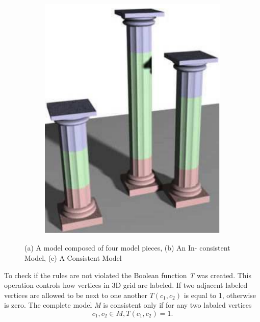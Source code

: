 \documentclass[b5paper,twoside,11pt]{article}
\begin{document}
\begin{figure}
\begin{subfigure}[b]{0.3\textwidth}
		\includegraphics[width=\textwidth]{1c}
		\caption{}
		\label{fig:1c}
	\end{subfigure}
	\caption{ (a) A model composed of four model pieces, (b) An In-
		consistent Model, (c) A Consistent Model}\label{fig:animals}
\end{figure}

To check if the rules are not violated the Boolean function \textit{T} was created. This operation controls how vertices in 3D grid are labeled. If two adjacent labeled vertices are allowed to be next to one another $T(c_1,c_2) $ is equal to 1, otherwise is zero. The complete model \textit{M} is consistent only if for any two labaled vertices 
\begin{equation}
c_1,c_2 \in M, T(c_1,c_2)=1.
\end{equation}
\end{document}
